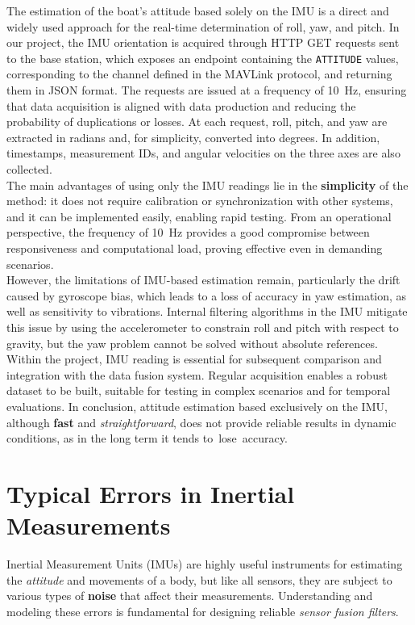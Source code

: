 The estimation of the boat's attitude based solely on the IMU is a direct and widely used approach for the real-time determination of roll, yaw, and pitch. In our project, the IMU orientation is acquired through HTTP GET requests sent to the base station, which exposes an endpoint containing the \texttt{ATTITUDE} values, corresponding to the channel defined in the MAVLink protocol, and returning them in JSON format. The requests are issued at a frequency of 10~Hz, ensuring that data acquisition is aligned with data production and reducing the probability of duplications or losses. At each request, roll, pitch, and yaw are extracted in radians and, for simplicity, converted into degrees. In addition, timestamps, measurement IDs, and angular velocities on the three axes are also collected.
\\The main advantages of using only the IMU readings lie in the \textbf{simplicity} of the method: it does not require calibration or synchronization with other systems, and it can be implemented easily, enabling rapid testing. From an operational perspective, the frequency of 10~Hz provides a good compromise between responsiveness and computational load, proving effective even in demanding scenarios. \\However, the limitations of IMU-based estimation remain, particularly the drift caused by gyroscope bias, which leads to a loss of accuracy in yaw estimation, as well as sensitivity to vibrations. Internal filtering algorithms in the IMU mitigate this issue by using the accelerometer to constrain roll and pitch with respect to gravity, but the yaw problem cannot be solved without absolute references.
\\Within the project, IMU reading is essential for subsequent comparison and integration with the data fusion system. Regular acquisition enables a robust dataset to be built, suitable for testing in complex scenarios and for temporal evaluations. In conclusion, attitude estimation based exclusively on the IMU, although \textbf{fast} and \textit{straightforward}, does not provide reliable results in dynamic conditions, as in the long term it tends to lose accuracy.

\section{Typical Errors in Inertial Measurements}

Inertial Measurement Units (IMUs) are highly useful instruments for estimating the \textit{attitude} and movements of a body, but like all sensors, they are subject to various types of \textbf{noise} that affect their measurements. Understanding and modeling these errors is fundamental for designing reliable \textit{sensor fusion filters}.

